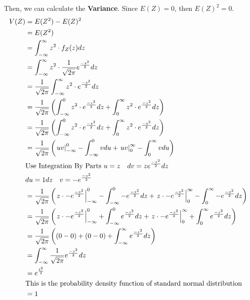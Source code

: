 \documentclass[11pt,oneside]{book}
\theoremstyle{break}
\theoremstyle{break}
\begin{document}
Then, we can calculate the \textbf{Variance}. Since $E(Z)=0$, then $E(Z)^2=0$. \begin{align*}
V(Z)&=E(Z^2)-E(Z)^2\\
&=E(Z^2)\\
&=\int_{-\infty}^{\infty}z^2\cdot f_Z(z)dz\\
&=\int_{-\infty}^{\infty}z^2\cdot \frac{1}{\sqrt{2\pi}}e^{\frac{-z^2}{2}}dz\\
&=\frac{1}{\sqrt{2\pi}}\int_{-\infty}^{\infty}z^2\cdot e^{\frac{-z^2}{2}}dz\\
&=\frac{1}{\sqrt{2\pi}}\left( \int_{-\infty}^{0}z^2\cdot e^{\frac{-z^2}{2}}dz+ \int_{0}^{\infty}z^2\cdot e^{\frac{-z^2}{2}}dz\right)\\
&=\frac{1}{\sqrt{2\pi}}\left(\int_{-\infty}^{0}z^2\cdot e^{\frac{-z^2}{2}}dz+ \int_{0}^{\infty}z^2\cdot e^{\frac{-z^2}{2}}dz\right)\\
&=\frac{1}{\sqrt{2\pi}}\left( \left. uv\right|_{-\infty}^0-\int_{-\infty}^{0}vdu+\left. uv\right|_{0}^{\infty}-\int_{0}^{\infty}vdu \right)\\
&\text{Use Integration By Parts }u=z \text{\quad} dv=z e^{\frac{-z^2}{2}}dz \\
&du=1dz \text{\quad} v=-e^{\frac{-z^2}{2}}\\
&=\frac{1}{\sqrt{2\pi}}\left( \left. z\cdot - e^{\frac{-z^2}{2}}\right|_{-\infty}^{0}  -\int_{-\infty}^{0} -e^{\frac{-z^2}{2}}dz +  \left. z\cdot - e^{\frac{-z^2}{2}}\right|_{0}^{\infty}  -\int_{0}^{\infty} -e^{\frac{-z^2}{2}}dz  \right)\\
&=\frac{1}{\sqrt{2\pi}}\left( \left. z\cdot - e^{\frac{-z^2}{2}}\right|_{-\infty}^{0}  +\int_{-\infty}^{0} e^{\frac{-z^2}{2}}dz +  \left. z\cdot - e^{\frac{-z^2}{2}}\right|_{0}^{\infty}  +\int_{0}^{\infty} e^{\frac{-z^2}{2}}dz  \right)\\
&=\frac{1}{\sqrt{2\pi}}\left((0-0)+(0-0)  +\int_{-\infty}^{\infty} e^{\frac{-z^2}{2}}dz\right)\\
&= \int_{-\infty}^{\infty} \frac{1}{\sqrt{2\pi}} e^{\frac{-z^2}{2}}dz \\
&=e^{\frac{t^2}{2}} \\
&\text{This is the probability density function of standard normal distribution}\\
&=1
\end{align*}
\end{document}
